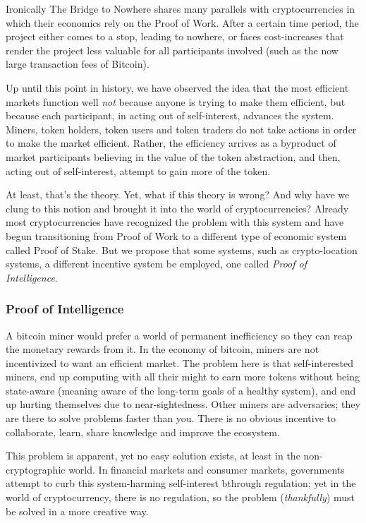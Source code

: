 \documentclass{article}
\begin{document}
Ironically The Bridge to Nowhere shares many parallels with cryptocurrencies in which their economics rely on the Proof of Work. After a certain time period, the project either comes to a stop, leading to nowhere, or faces cost-increases that render the project less valuable for all participants involved (such as the now large transaction fees of Bitcoin).

Up until this point in history, we have observed the idea that the most efficient markets function well \textit{not} because anyone is trying to make them efficient, but because each participant, in acting out of self-interest, advances the system. Miners, token holders, token users and token traders do not take actions in order to make the market efficient. Rather, the efficiency arrives as a byproduct of  market participants believing in the value of the token abstraction, and then, acting out of self-interest, attempt to gain more of the token.

At least, that's the theory. Yet, what if this theory is wrong? And why have we clung to this notion and brought it into the world of cryptocurrencies? Already most cryptocurrencies have recognized the problem with this system and have begun transitioning from Proof of Work to a different type of economic system called Proof of Stake. But we propose that some systems, such as crypto-location systems, a different incentive system be employed, one called \textit{Proof of Intelligence}.

\subsubsection{Proof of Intelligence}

A bitcoin miner would prefer a world of permanent inefficiency so they can reap the monetary rewards from it. In the economy of bitcoin, miners are not incentivized to want an efficient market. The problem here is that self-interested miners, end up computing with all their might to earn more tokens without being state-aware (meaning aware of the long-term goals of a healthy system), and end up hurting themselves due to near-sightedness. Other miners are adversaries; they are there to solve problems faster than you. There is no obvious incentive to collaborate, learn, share knowledge and improve the ecosystem.

This problem is apparent, yet no easy solution exists, at least in the non-cryptographic world. In financial markets and consumer markets, governments attempt to curb this system-harming self-interest bthrough regulation; yet in the world of cryptocurrency, there is no regulation, so the problem (\textit{thankfully}) must be solved in a more creative way.
\end{document}
